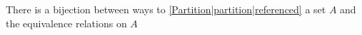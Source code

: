 

There is a bijection between ways to \ref{Partition|partition|referenced} a set $A$ and the equivalence relations on $A$
